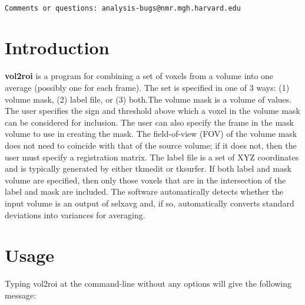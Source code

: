 \documentclass[10pt]{article}
\begin{document}
\begin{Large}
 \\
\end{Large}

\noindent 
\begin{verbatim}
Comments or questions: analysis-bugs@nmr.mgh.harvard.edu
\end{verbatim}

\section{Introduction}

{\bf vol2roi} is a program for combining a set of voxels from a volume
into one average (possibly one for each frame). The set is specified
in one of 3 ways: (1) volume mask, (2) label file, or (3) both.The
volume mask is a volume of values. The user specifies the sign and
threshold above which a voxel in the volume mask can be considered for
inclusion. The user can also specify the frame in the mask volume to
use in creating the mask.  The field-of-view (FOV) of the volume mask
does not need to coincide with that of the source volume; if it does
not, then the user must specify a registration matrix.  The label file
is a set of XYZ coordinates and is typically generated by either
tkmedit or tksurfer.  If both label and mask volume are specified, then
only those voxels that are in the intersection of the label and mask
are included.  The software automatically detects whether the input
volume is an output of selxavg and, if so, automatically converts
standard deviations into variances for averaging.\\

\section{Usage}
Typing vol2roi at the command-line without any options will give the
following message:\\ 
\end{document}
